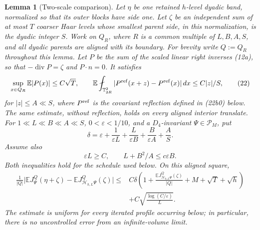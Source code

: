 \documentclass{smfart}
\newtheorem{lemma}[theorem]{Lemma}
\theoremstyle{definition}
\newcommand{\1}{\mathbf 1}
\begin{document}
\begin{lemma}[Two-scale comparison]\label{lem:two-scale-scalarization}
Let $\eta$ be one retained $h$-level dyadic band, normalized so that
its outer blocks have side one. Let $\zeta$ be an independent sum of
at most $T$ coarser Haar levels whose smallest parent side, in this
normalization, is the dyadic integer $S$.  Work on $Q_ R$, where
$R$ is a common multiple of $L,B,A,S$, and all dyadic parents are
aligned with its boundary.  For brevity write $Q:=Q_R$ throughout this
lemma.  Let $P$ be the sum of the scaled linear
right inverses (12a), so that
$-\operatorname {div}P=\zeta$ and $P\cdot n=0$. It satisfies
\begin{equation}
\sup_ {x\in Q_ R}\mathbb E|P(x)|\leq C\sqrt T,\qquad
\mathbb E\fint_ {\mathbb T_ {2R}^2}
|P^{\rm ref}(x+z)-P^{\rm ref}(x)|\,dx\leq C|z|/S,
\tag{22}
\end{equation}
for $|z|\leq A\ll S$, where $P^{\rm ref}$ is the covariant
reflection defined in (22b0) below.  The same estimate, without
reflection, holds on every aligned interior translate.
For $1\ll L\ll B\ll A\ll S$, $0<\varepsilon<1/10$, and a
$D_ 4$-invariant $\Psi\in\mathscr P_ M$, put
\begin{equation}
\delta=\varepsilon+\frac1{\varepsilon L}
+\frac{L}{\varepsilon B}+\frac{B}{\varepsilon A}+\frac AS.
\tag{23}
\end{equation}
Assume also
\begin{equation}
\varepsilon L\geq C,\qquad L+B^2/A\leq c\varepsilon B.
\tag{23a}
\end{equation}
Both inequalities hold for the schedule used below.
On this aligned square,
\begin{equation}
\begin{split}
\frac1{|Q|}\bigl|\mathbb EJ_ \Psi^Q(\eta+\zeta)
-\mathbb EJ_ {\mathcal H_ {h,L}\Psi}^Q(\zeta)\bigr|
\leq {}&C\delta\left(
1+\frac{\mathbb EJ_ {\mathcal H_ {h,L}\Psi}^Q(\zeta)}{|Q|}
+M+\sqrt T+\sqrt h\right)\\
&+C\sqrt{\frac{\log(C/\varepsilon)}L}.                            
\end{split}
\tag{24}
\label{eq:two-scale-scalarization}
\end{equation}
The estimate is uniform for every iterated profile occurring below; in
particular, there is no uncontrolled error from an infinite-volume limit.

\end{lemma}
\end{document}
